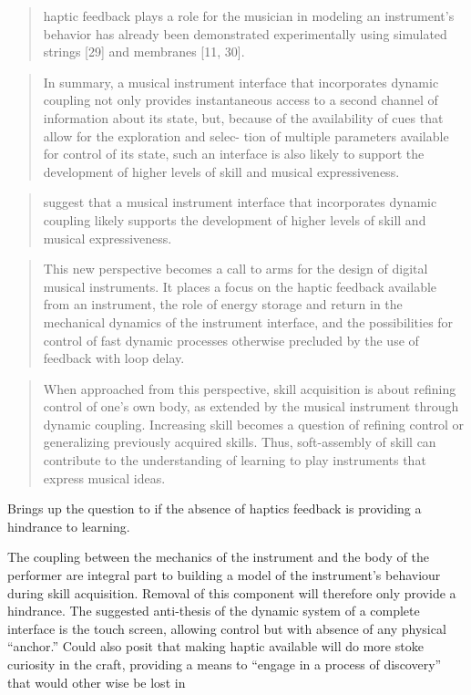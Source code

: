 \begin{quotation}
    haptic feedback plays a role for the musician in modeling an instrument’s behavior has already been demonstrated experimentally using simulated strings [29] and membranes [11, 30].
\end{quotation}

\begin{quotation}
In summary, a musical instrument interface that incorporates dynamic coupling not only provides instantaneous access to a second channel of information about its state, but, because of the availability of cues that allow for the exploration and selec- tion of multiple parameters available for control of its state, such an interface is also likely to support the development of higher levels of skill and musical expressiveness.
\end{quotation}

\begin{quotation}
    suggest that a musical instrument interface that incorporates dynamic coupling likely supports the development of higher levels of skill and musical expressiveness.
\end{quotation}

\begin{quotation}
    This new perspective becomes a call to arms for the design of digital musical instruments. It places a focus on the haptic feedback available from an instrument, the role of energy storage and return in the mechanical dynamics of the instrument interface, and the possibilities for control of fast dynamic processes otherwise precluded by the use of feedback with loop delay.
\end{quotation}

\begin{quotation}
    When approached from this perspective, skill acquisition is about refining control of one’s own body, as extended by the musical instrument through dynamic coupling. Increasing skill becomes a question of refining control or generalizing previously acquired skills. Thus, soft-assembly of skill can contribute to the understanding of learning to play instruments that express musical ideas.
\end{quotation}

Brings up the question to if the absence of haptics feedback is providing a hindrance to learning.

The coupling between  the mechanics of the instrument and the body of the performer are integral part to building a model of the instrument's behaviour during skill acquisition. Removal of this component will therefore only provide a hindrance. The suggested anti-thesis of the dynamic system of a complete interface is the touch screen, allowing control but with absence of any physical ``anchor.''
Could also posit that making haptic available will do more stoke curiosity in the craft, providing a  means to ``engage in a process of discovery'' that would other wise be lost in 

